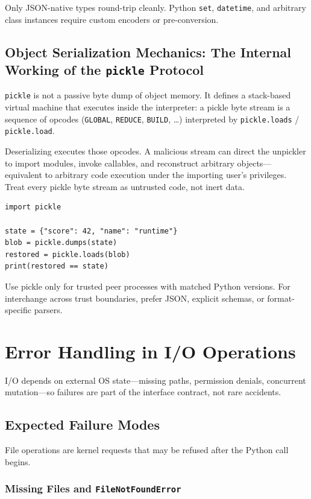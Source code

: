 \documentclass[a4paper,twoside]{report}
\begin{document}
Only JSON-native types round-trip cleanly. Python \texttt{set}, \texttt{datetime}, and arbitrary class instances require custom encoders or pre-conversion.


\subsection{Object Serialization Mechanics: The Internal Working of the \texttt{pickle} Protocol}

\texttt{pickle} is not a passive byte dump of object memory. It defines a stack-based virtual machine that executes inside the interpreter: a pickle byte stream is a sequence of opcodes (\texttt{GLOBAL}, \texttt{REDUCE}, \texttt{BUILD}, \ldots) interpreted by \texttt{pickle.loads} / \texttt{pickle.load}.

Deserializing executes those opcodes. A malicious stream can direct the unpickler to import modules, invoke callables, and reconstruct arbitrary objects---equivalent to arbitrary code execution under the importing user's privileges. Treat every pickle byte stream as untrusted code, not inert data.

\begin{verbatim}
import pickle

state = {"score": 42, "name": "runtime"}
blob = pickle.dumps(state)
restored = pickle.loads(blob)
print(restored == state)
\end{verbatim}

Use pickle only for trusted peer processes with matched Python versions. For interchange across trust boundaries, prefer JSON, explicit schemas, or format-specific parsers.


\section{Error Handling in I/O Operations}

I/O depends on external OS state---missing paths, permission denials, concurrent mutation---so failures are part of the interface contract, not rare accidents.


\subsection{Expected Failure Modes}

File operations are kernel requests that may be refused after the Python call begins.

\subsubsection{Missing Files and \texttt{FileNotFoundError}}
\end{document}
